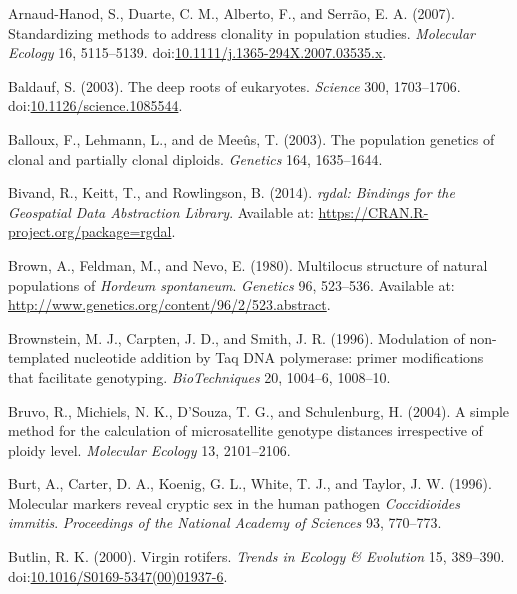 \documentclass[double,12pt]{beavtex}
\begin{document}
  \hypertarget{ref-arnaud2007standardizing}{}
  Arnaud-Hanod, S., Duarte, C. M., Alberto, F., and Serrão, E. A. (2007).
  Standardizing methods to address clonality in population studies.
  \emph{Molecular Ecology} 16, 5115--5139.
  doi:\href{https://doi.org/10.1111/j.1365-294X.2007.03535.x}{10.1111/j.1365-294X.2007.03535.x}.
  
  \hypertarget{ref-baldauf2003deep}{}
  Baldauf, S. (2003). The deep roots of eukaryotes. \emph{Science} 300,
  1703--1706.
  doi:\href{https://doi.org/10.1126/science.1085544}{10.1126/science.1085544}.
  
  \hypertarget{ref-balloux2003population}{}
  Balloux, F., Lehmann, L., and de Meeûs, T. (2003). The population
  genetics of clonal and partially clonal diploids. \emph{Genetics} 164,
  1635--1644.
  
  \hypertarget{ref-bivand2014rgdal}{}
  Bivand, R., Keitt, T., and Rowlingson, B. (2014). \emph{rgdal: Bindings
  for the Geospatial Data Abstraction Library}. Available at:
  \url{https://CRAN.R-project.org/package=rgdal}.
  
  \hypertarget{ref-brown1980multilocus}{}
  Brown, A., Feldman, M., and Nevo, E. (1980). Multilocus structure of
  natural populations of \emph{Hordeum spontaneum}. \emph{Genetics} 96,
  523--536. Available at:
  \url{http://www.genetics.org/content/96/2/523.abstract}.
  
  \hypertarget{ref-brownstein1996modulation}{}
  Brownstein, M. J., Carpten, J. D., and Smith, J. R. (1996). Modulation
  of non-templated nucleotide addition by Taq DNA polymerase: primer
  modifications that facilitate genotyping. \emph{BioTechniques} 20,
  1004--6, 1008--10.
  
  \hypertarget{ref-bruvo2004simple}{}
  Bruvo, R., Michiels, N. K., D'Souza, T. G., and Schulenburg, H. (2004).
  A simple method for the calculation of microsatellite genotype distances
  irrespective of ploidy level. \emph{Molecular Ecology} 13, 2101--2106.
  
  \hypertarget{ref-burt1996molecular}{}
  Burt, A., Carter, D. A., Koenig, G. L., White, T. J., and Taylor, J. W.
  (1996). Molecular markers reveal cryptic sex in the human pathogen
  \emph{Coccidioides immitis}. \emph{Proceedings of the National Academy
  of Sciences} 93, 770--773.
  
  \hypertarget{ref-butlin2000virgin}{}
  Butlin, R. K. (2000). Virgin rotifers. \emph{Trends in Ecology \&
  Evolution} 15, 389--390.
  doi:\href{https://doi.org/10.1016/S0169-5347(00)01937-6}{10.1016/S0169-5347(00)01937-6}.
  
\end{document}

